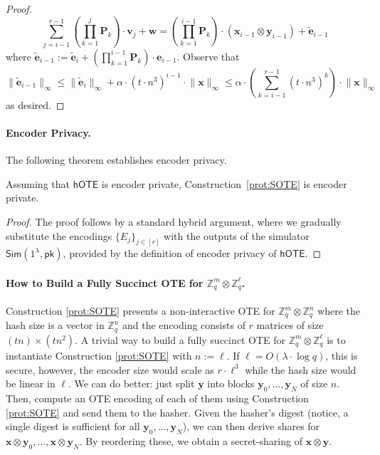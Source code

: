 \documentclass{theoretics}
\newcommand{\BOTE}{\mathsf{hOTE}}
\newcommand{\Z}{\mathbb{Z}}
\renewcommand{\sec}{\ensuremath{\lambda}}
\newcommand{\Sim}{\mathsf{Sim}}
\newcommand{\pk}{{\mathsf{pk}}}
\begin{document}
\begin{proof}
\[\sum_{j=i-1}^{r-1} \left(\prod_{k=1}^{j} \mathbf{P}_k\right)\cdot\mathbf{v}_j+\mathbf{w}=\left(\prod_{k=1}^{i-1} \mathbf{P}_k\right)\cdot(\mathbf{x}_{i-1}\otimes \mathbf{y}_{i-1})+\widetilde{\mathbf{e}}_{i-1}\]
where $\widetilde{\mathbf{e}}_{i-1}:=\widetilde{\mathbf{e}}_{i}+\left(\prod_{k=1}^{i-1} \mathbf{P}_k\right)\cdot \mathbf{e}_{i-1}$.
Observe that \[\lVert\widetilde{\mathbf{e}}_{i-1}\rVert_\infty\le \lVert\widetilde{\mathbf{e}}_{i}\rVert_\infty+\alpha\cdot (t\cdot n^3)^{i-1}\cdot\lVert\mathbf{x}\rVert_\infty\le \alpha\cdot \left(\sum_{k=i-1}^{r-1} (t \cdot n^3)^k\right)\cdot \lVert \mathbf{x}\rVert_\infty\]
as desired.
\end{proof}

\paragraph{Encoder Privacy.} The following theorem establishes encoder privacy.

\begin{theorem}
    Assuming that $\BOTE$ is encoder private, Construction~\ref{prot:SOTE} is encoder private.
\end{theorem}
\begin{proof}
    The proof follows by a standard hybrid argument, where we gradually substitute the encodings $\{E_j\}_{j\in[r]}$ with the outputs of the simulator $\Sim(1^\sec, \pk)$, provided by the definition of encoder privacy of $\BOTE$.
\end{proof}

\paragraph{How to Build a Fully Succinct OTE for $\Z_q^m\otimes \Z_q^\ell$.}
Construction \ref{prot:SOTE} presents a non-interactive OTE for $\Z_q^m\otimes \Z_q^n$ where the hash size is a vector in $\Z_q^n$ and the encoding consists of $r$ matrices of size $(tn)\times (tn^2)$. A trivial way to build a fully succinct OTE for $\Z_q^m\otimes \Z_q^\ell$ is to instantiate Construction \ref{prot:SOTE} with $n:=\ell$. If $\ell=O(\sec\cdot \log q)$, this is secure, however, the encoder size would scale as $r\cdot \ell^3$ while the hash size would be linear in $\ell$. We can do better: just split $\mathbf{y}$ into blocks $\mathbf{y}_0, \dots, \mathbf{y}_N$ of size $n$. Then, compute an OTE encoding of each of them using Construction \ref{prot:SOTE} and send them to the hasher. Given the hasher's digest (notice, a single digest is sufficient for all $\mathbf{y}_0, \dots, \mathbf{y}_N$), we can then derive shares for $\mathbf{x}\otimes \mathbf{y}_0, \dots, \mathbf{x}\otimes \mathbf{y}_N$. By reordering these, we obtain a secret-sharing of $\mathbf{x}\otimes \mathbf{y}$. 
\end{document}
